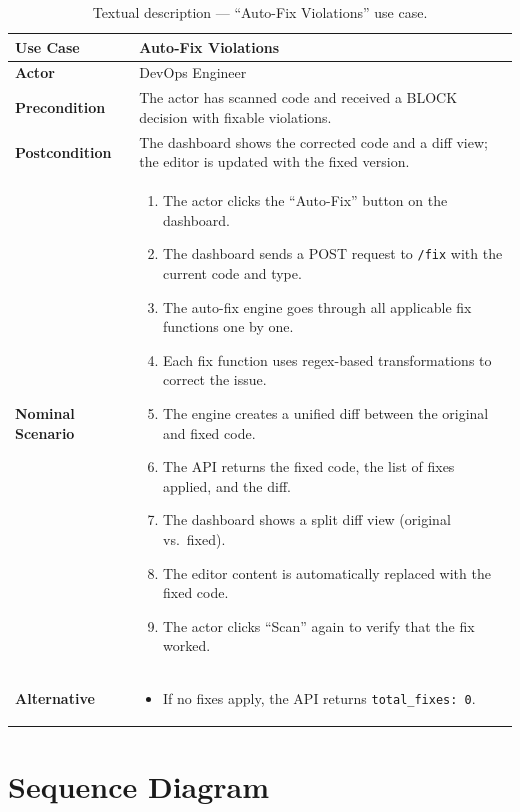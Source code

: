 \begin{table}[H]
\centering
\begin{tabularx}{\textwidth}{|l|X|}
\hline
\textbf{Use Case} & Auto-Fix Violations \\
\hline
\textbf{Actor} & DevOps Engineer \\
\hline
\textbf{Precondition} & The actor has scanned code and received a BLOCK decision with fixable violations. \\
\hline
\textbf{Postcondition} & The dashboard shows the corrected code and a diff view; the editor is updated with the fixed version. \\
\hline
\textbf{Nominal Scenario} &
  \begin{enumerate}[leftmargin=0.8cm, nosep]
    \item The actor clicks the ``Auto-Fix'' button on the dashboard.
    \item The dashboard sends a POST request to \texttt{/fix} with the current code and type.
    \item The auto-fix engine goes through all applicable fix functions one by one.
    \item Each fix function uses regex-based transformations to correct the issue.
    \item The engine creates a unified diff between the original and fixed code.
    \item The API returns the fixed code, the list of fixes applied, and the diff.
    \item The dashboard shows a split diff view (original vs.\ fixed).
    \item The editor content is automatically replaced with the fixed code.
    \item The actor clicks ``Scan'' again to verify that the fix worked.
  \end{enumerate} \\
\hline
\textbf{Alternative} &
  \begin{itemize}[leftmargin=0.8cm, nosep]
    \item[A1.] If no fixes apply, the API returns \texttt{total\_fixes: 0}.
  \end{itemize} \\
\hline
\end{tabularx}
\caption{Textual description --- ``Auto-Fix Violations'' use case.}
\label{tab:uc-fix}
\end{table}


\section{Sequence Diagram}

